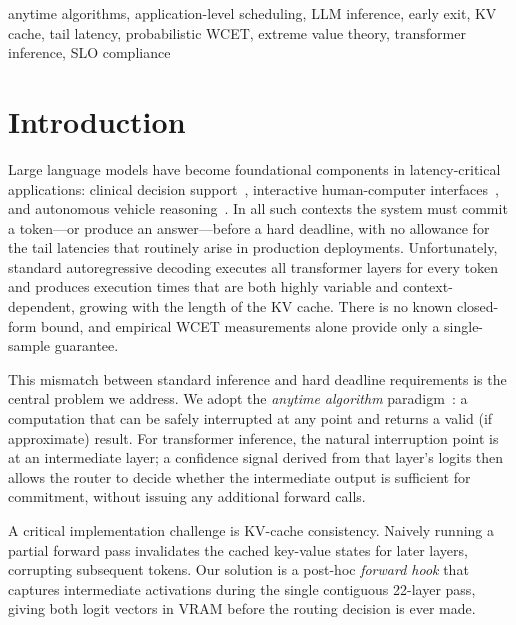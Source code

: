 \documentclass[conference]{IEEEtran}
\begin{document}
\begin{IEEEkeywords}
anytime algorithms, application-level scheduling, LLM inference,
early exit, KV cache, tail latency, probabilistic WCET, extreme value theory,
transformer inference, SLO compliance
\end{IEEEkeywords}

\section{Introduction}

Large language models have become foundational components in
latency-critical applications: clinical decision support~\cite{singhal2023large},
interactive human-computer interfaces~\cite{ouyang2022training}, and
autonomous vehicle reasoning~\cite{wen2023dilu}.
In all such contexts the system must commit a token---or produce an
answer---before a hard deadline, with no allowance for the tail latencies
that routinely arise in production deployments.
Unfortunately, standard autoregressive decoding executes all transformer
layers for every token and produces execution times that are both highly
variable and context-dependent, growing with the length of the KV cache.
There is no known closed-form bound, and empirical WCET measurements
alone provide only a single-sample guarantee.

This mismatch between standard inference and hard deadline requirements
is the central problem we address.
We adopt the \emph{anytime algorithm} paradigm~\cite{boddy1994deliberation,
zilberstein1996using}: a computation that can be safely interrupted at
any point and returns a valid (if approximate) result.
For transformer inference, the natural interruption point is at an
intermediate layer; a confidence signal derived from that layer's logits
then allows the router to decide whether the intermediate output is
sufficient for commitment, without issuing any additional forward calls.

A critical implementation challenge is KV-cache consistency.
Naively running a partial forward pass invalidates the cached key-value
states for later layers, corrupting subsequent tokens.
Our solution is a post-hoc \emph{forward hook} that captures intermediate
activations during the single contiguous 22-layer pass, giving both logit
vectors in VRAM before the routing decision is ever made.
\end{document}

